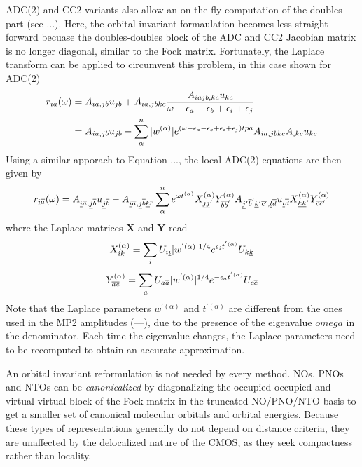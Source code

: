 ADC(2) and CC2 variants also allow an on-the-fly computation of the doubles part (see ...). Here, the orbital invariant formaulation becomes less straight-forward becuase the doubles-doubles block of the ADC and CC2 Jacobian matrix is no longer diagonal, similar to the Fock matrix. Fortunately, the Laplace transform can be applied to circumvent this problem, in this case shown for ADC(2)
\begin{equation}
\begin{split}
r_{ia}(\omega) &= A_{ia,jb} u_{jb} + A_{ia,jbkc} \frac{A_{iajb,kc} u_{kc}}{\omega - \epsilon_a - \epsilon_b + \epsilon_i + \epsilon_j} \\
&= A_{ia,jb} u_{jb} - \sum_{\alpha}^{n} |w^{(\alpha)}| e^{\left(\omega - \epsilon_a - \epsilon_b + \epsilon_i + \epsilon_j\right) tpa} A_{ia,jbkc} A_{,kc} u_{kc} 
\end{split}
\end{equation}
Using a similar apporach to Equation ..., the local ADC(2) equations are then given by 
\begin{equation}
r_{\underline{i} \overline{a}}(\omega) = A_{\underline{i} \overline{a}, \underline{j} \overline{b}} u_{\underline{j} \overline{b}} - A_{\underline{i} \overline{a}, \underline{j} \overline{b} \underline{k} \overline{c}} \sum_{\alpha}^{n} e^{\omega t^{(\alpha)}} X_{\underline{j} \underline{j}'}^{(\alpha)} Y_{\overline{b} \overline{b}'}^{(\alpha)} A_{\underline{j}' \overline{b}' \underline{k}' \overline{c}', \underline{l} \overline{d}} u_{\underline{l} \overline{d}} X_{\underline{k} \underline{k}'}^{(\alpha)} Y_{\overline{c} \overline{c}'}^{(\alpha)}  \\
\end{equation}
\noindent where the Laplace matrices $\mathbf{X}$ and $\mathbf{Y}$ read
\begin{equation}
X_{\underline{i}\underline{k}}^{(\alpha)} = \sum_i U_{i\underline{i}} |w^{'(\alpha)}|^{1/4} e^{\epsilon_i t^{'(\alpha)}} U_{k\underline{k}}
\end{equation}
\begin{equation}
Y_{\overline{a}\overline{c}}^{(\alpha)} = \sum_a U_{a\overline{a}} |w^{'(\alpha)}|^{1/4} e^{-\epsilon_a t^{'(\alpha)}} U_{c\overline{c}}
\end{equation}
\noindent Note that the Laplace parameters $w^{'(\alpha)}$ and $t^{'(\alpha)}$ are different from the ones used in the MP2 amplitudes (---), due to the presence of the eigenvalue $omega$ in the denominator. Each time the eigenvalue changes, the Laplace parameters need to be recomputed to obtain an accurate approximation. 

An orbital invariant reformulation is not needed by every method. NOs, PNOs and NTOs can be \emph{canonicalized} by diagonalizing the occupied-occupied and virtual-virtual block of the Fock matrix in the truncated NO/PNO/NTO basis to get a smaller set of canonical molecular orbitals and orbital energies. Because these types of representations generally do not depend on distance criteria, they are unaffected by the delocalized nature of the CMOS, as they seek compactness rather than locality. 

